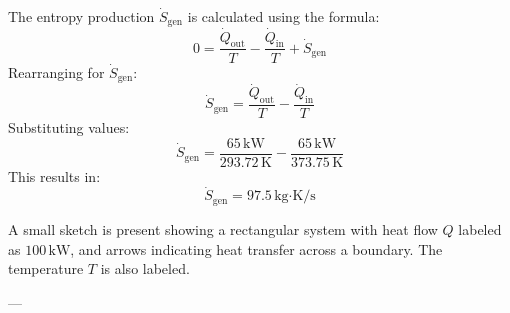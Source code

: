 The entropy production \( \dot{S}_{\text{gen}} \) is calculated using the formula:  
\[
0 = \frac{\dot{Q}_{\text{out}}}{T} - \frac{\dot{Q}_{\text{in}}}{T} + \dot{S}_{\text{gen}}
\]  
Rearranging for \( \dot{S}_{\text{gen}} \):  
\[
\dot{S}_{\text{gen}} = \frac{\dot{Q}_{\text{out}}}{T} - \frac{\dot{Q}_{\text{in}}}{T}
\]  
Substituting values:  
\[
\dot{S}_{\text{gen}} = \frac{65 \, \text{kW}}{293.72 \, \text{K}} - \frac{65 \, \text{kW}}{373.75 \, \text{K}}
\]  
This results in:  
\[
\dot{S}_{\text{gen}} = 97.5 \, \text{kg·K/s}
\]  

A small sketch is present showing a rectangular system with heat flow \( Q \) labeled as \( 100 \, \text{kW} \), and arrows indicating heat transfer across a boundary. The temperature \( T \) is also labeled.

---